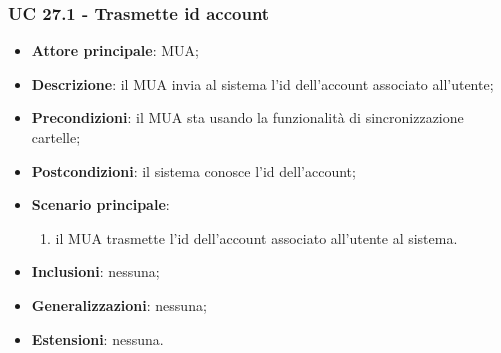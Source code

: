     \subsubsection{UC 27.1 - Trasmette id account} \label{sec:UC27.1}
    \begin{itemize}
        \item \textbf{Attore principale}: MUA;
        \item \textbf{Descrizione}: il MUA invia al sistema l'id dell'account associato all'utente;
        \item \textbf{Precondizioni}: il MUA sta usando la funzionalità di sincronizzazione cartelle;
        \item \textbf{Postcondizioni}: il sistema conosce l'id dell'account;
        \item \textbf{Scenario principale}:
            \begin{enumerate}
                \item il MUA trasmette l'id dell'account associato all'utente al sistema.
            \end{enumerate}
        \item \textbf{Inclusioni}: nessuna;
        \item \textbf{Generalizzazioni}: nessuna;
        \item \textbf{Estensioni}: nessuna.
    \end{itemize}

